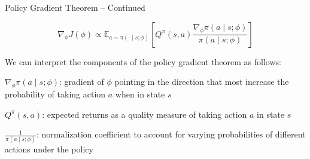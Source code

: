 
\begin{frame}{Policy Gradient Theorem -- Continued}

\begin{intuitionbox}
    \[
        \nabla_{\phi} J(\phi) \propto \mathbb{E}_{a \sim \pi(\cdot \mid s; \phi)} \left[Q^{\pi}(s, a) \frac{\nabla_{\phi} \pi(a \mid s; \phi)}{\pi(a \mid s; \phi)} \right]
    \]
    \vspace{.3em}

    We can interpret the components of the policy gradient theorem as follows:
    \blist
        \item<1->  $\nabla_{\phi} \pi(a \mid s; \phi)$: gradient of $\phi$ pointing in the direction that most increase the probability of taking action $a$ when in state $s$
        \item<2->  $Q^{\pi}(s, a)$: expected returns as a quality measure of taking action $a$ in state $s$
        \item<3-> $\frac{1}{\pi(a \mid s; \phi)}$: normalization coefficient to account for varying probabilities of different actions under the policy
    \elist
\end{intuitionbox}

    
\end{frame}

